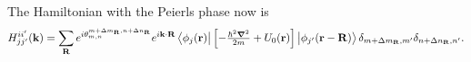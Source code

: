 The Hamiltonian with the Peierls phase now is
\begin{gather}
	H_{jj'}^{ii'}(\mathbf{k}) =\sum_{\mathbf{R}} e^{i \theta_{m,n}^{m + \Delta m_{\mathbf{R}},n + \Delta n_{\mathbf{R}}} } e^{i \mathbf{k}\cdot \mathbf{R}} \bra{\phi_{j}(\mathbf{r})} \left[-\tfrac{\hbar^{2} \boldsymbol{\nabla}^{2}}{2m} + U_{0}(\mathbf{r})\right] \ket{\phi_{j'}(\mathbf{r}-\mathbf{R})}\delta_{m + \Delta m_{\mathbf{R}},m'} \delta_{n + \Delta n_{\mathbf{R}},n'}.
\end{gather}
